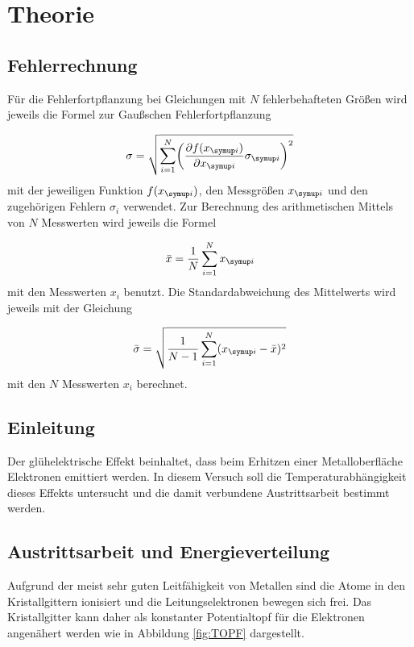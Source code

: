 \section{Theorie}
\label{sec:Theorie}

\subsection{Fehlerrechnung}

Für die Fehlerfortpflanzung bei Gleichungen mit $N$ fehlerbehafteten Größen
wird jeweils die Formel zur Gaußschen Fehlerfortpflanzung

\begin{equation*}
  \sigma = \sqrt{\sum_{i=1}^{N}\biggl(\frac{\partial f(x_{\g{i}})}{\partial x_{\g{i}}}
  \sigma_{\g{i}}\biggr)^2}
\end{equation*}
mit der jeweiligen Funktion $f(x_{\g{i}})$, den Messgrößen $x_{\g{i}}$ und den
zugehörigen Fehlern $\sigma_i$ verwendet.
Zur Berechnung des arithmetischen Mittels von $N$ Messwerten wird jeweils die
Formel

\begin{equation*}
  \bar{x} = \frac{1}{N}\sum_{i=1}^{N}x_{\g{i}}
\end{equation*}
mit den Messwerten $x_i$ benutzt.
Die Standardabweichung des Mittelwerts wird jeweils mit der Gleichung

\begin{equation*}
  \bar{\sigma} = \sqrt{\frac{1}{N-1}\sum_{i=1}^{N}(x_{\g{i}} - \bar{x})^2}
\end{equation*}
mit den $N$ Messwerten $x_i$ berechnet.


\subsection{Einleitung}

Der glühelektrische Effekt beinhaltet, dass beim Erhitzen einer Metalloberfläche
Elektronen emittiert werden. In diesem Versuch soll die Temperaturabhängigkeit
dieses Effekts untersucht und die damit verbundene Austrittsarbeit bestimmt
werden.

\subsection{Austrittsarbeit und Energieverteilung}

Aufgrund der meist sehr guten Leitfähigkeit von Metallen sind die Atome in
den Kristallgittern ionisiert und die Leitungselektronen bewegen sich
frei. Das Kristallgitter kann daher als konstanter Potentialtopf für die
Elektronen angenähert werden wie in Abbildung \ref{fig:TOPF} dargestellt.

